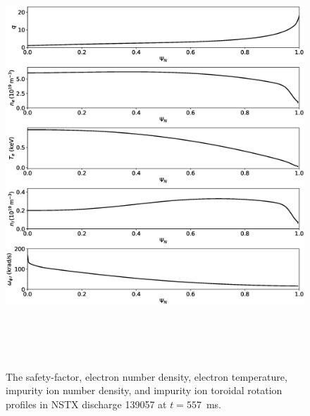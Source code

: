 \documentclass[12pt,prb,aps]{revtex4-1}
\begin{document}
\begin{figure}
\centerline{\includegraphics[height=6.25in]{Fig12.eps}}
\caption{The safety-factor, electron number density, electron temperature, impurity ion number density, and  impurity ion toroidal rotation profiles in NSTX discharge 139057 at $t=557$\, ms.}\label{fig12}
\end{figure}
\end{document}
